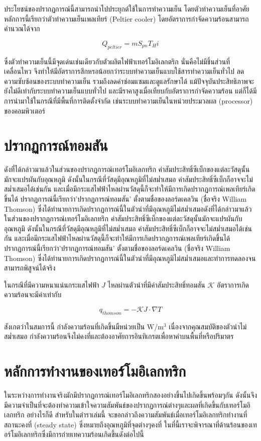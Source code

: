 \documentclass[a4paper,nobib,openany,10pt]{tufte-book}
\begin{document}
ประโยชน์ของปรากฏการณ์นี้สามารถนำไปประยุกต์ใช้ในการทำความเย็น โดยตัวทำความเย็นที่อาศัยหลักการนี้เรียกว่าตัวทำความเย็นเพลเทียร์ (Peltier cooler) โดยอัตราการกำจัดความร้อนสามารถคำนวณได้จาก

\begin{equation}
  Q_{peltier} = m S_{pn} T_H i
\end{equation}

ซึ่งตัวทำความเย็นนี้มีจุดเด่นเช่นเดียวกับตัวผลิตไฟฟ้าเทอร์โมอิเลกตริก
นั่นคือไม่มีชิ้นส่วนที่เคลื่อนไหว
จึงทำให้มีอัตราการสึกหรอน้อยกว่าระบบทำความเย็นแบบใช้สารทำความเย็นทั่วไป
ลดความซับซ้อนของระบบทำความเย็น รวมถึงลดค่าซ่อมแซมและดูแลรักษาได้
แม้ปัจจุบันประสิทธิภาพจะยังไม่ดีเท่ากับระบบทำความเย็นแบบทั่วไป
และมีราคาสูงเมื่อเทียบกับอัตราการกำจัดความร้อน
แต่ก็ได้มีการนำมาใช้ในกรณีที่มีพื้นที่การติดตั้งจำกัด
เช่นระบบทำความเย็นในหน่วยประมวลผล (processor) ของคอมพิวเตอร์

\section{ปรากฏการณ์ทอมสัน}
\label{sec:org1a7279d}
ดังที่ได้กล่าวมาแล้วในส่วนของปรากฏการณ์เทอร์โมอิเลกทริก
ค่าสัมประสิทธิ์ซีเบ็กของแต่ละวัสดุนั้นมักจะแปรผันกับอุณหภูมิ
ดังนั้นในกรณีที่วัสดุมีอุณหภูมิที่ไม่สม่ำเสมอ
ค่าสัมประสิทธิ์ซีเบ็กก็อาจจะไม่สม่ำเสมอได้เช่นกัน
และเมื่อมีกระแสไฟฟ้าไหลผ่านวัสดุนี้ก็จะทำให้มีการเกิดปรากฏการณ์เพลเทียร์เกิดขึ้นได้
ปรากฏการณ์นี้เรียกว่า'ปรากฏการณ์ทอมสัน' ตั้งตามชื่อของลอร์ดเคลวิน
(ชื่อจริง William Thomson)
ซึ่งได้ทำนายการเกิดปรากฏการณ์นี้ในตัวนำที่มีอุณหภูมิไม่สม่ำเสมอดังที่ได้กล่าวมาแล้วในส่วนของปรากฏการณ์เทอร์โมอิเลกทริก
ค่าสัมประสิทธิ์ซีเบ็กของแต่ละวัสดุนั้นมักจะแปรผันกับอุณหภูมิ
ดังนั้นในกรณีที่วัสดุมีอุณหภูมิที่ไม่สม่ำเสมอ
ค่าสัมประสิทธิ์ซีเบ็กก็อาจจะไม่สม่ำเสมอได้เช่นกัน
และเมื่อมีกระแสไฟฟ้าไหลผ่านวัสดุนี้ก็จะทำให้มีการเกิดปรากฏการณ์เพลเทียร์เกิดขึ้นได้
ปรากฏการณ์นี้เรียกว่า'ปรากฏการณ์ทอมสัน' ตั้งตามชื่อของลอร์ดเคลวิน
(ชื่อจริง William Thomson)
ซึ่งได้ทำนายการเกิดปรากฏการณ์นี้ในตัวนำที่มีอุณหภูมิไม่สม่ำเสมอและทำการทดลองจนสามารถพิสูจน์ได้จริง

ในกรณีที่มีความหนาแน่นกระแสไฟฟ้า \(J\)
ไหลผ่านตัวนำที่มีค่าสัมประสิทธิ์ทอมสัน \(\mathcal{K}\)
อัตราการเกิดความร้อนจะมีค่าเท่ากับ

\[q_{thomson} = - \mathcal{K} J \cdot \nabla T\]

สังเกตว่าในสมการนี้ กำลังความร้อนที่เกิดขึ้นมืหน่วยเป็น W/m\(^3\)
เนื่องจากคุณสมบัติของตัวนำไม่สม่ำเสมอ
กำลังความร้อนจึงไม่คงที่และต้องอาศัยการอินทิเกรตเพื่อหาค่าบนพื้นที่หรือปริมาตร

\section{หลักการทำงานของเทอร์โมอิเลกทริก}
\label{sec:orgca9eabf}
ในระหว่างการทำงานจริงมักมีปรากฏการณ์เทอร์โมอิเลกทริกสองอย่างขึ้นไปเกิดขึ้นพร้อมๆกัน
ดังนั้นจึงมีความจำเป็นที่จะต้องทำความเข้าใจความสัมพันธ์ของปรากฏการณ์ต่างๆและผลที่เกิดขึ้นกับเทอร์โมอิเลกทริก
อย่างไรก็ดี สำหรับในตำราเล่มนี้
จะขอกล่าวถึงความสัมพันธ์เมื่อเทอร์โมอิเลกทริกทำงานที่สถานะคงที่ (steady
state) ซึ่งหมายถึงอุณหภูมิที่จุดต่างๆคงที่
ในที่นี้เราจะพิจารณาที่ด้านร้อนของเทอร์โมอิเลกทริกซึ่งมีการถ่ายเทความร้อนเกิดขึ้นดังต่อไปนี้
\end{document}
